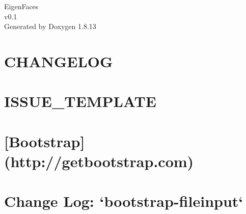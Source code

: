 \documentclass[twoside]{book}
\newcommand{\+}{\discretionary{\mbox{\scriptsize$\hookleftarrow$}}{}{}}
\newcommand{\clearemptydoublepage}{%
  \newpage{\pagestyle{empty}\cleardoublepage}%
}
\begin{document}
\hypersetup{pageanchor=false,
             bookmarksnumbered=true,
             pdfencoding=unicode
            }
\begin{titlepage}
\vspace*{7cm}
\begin{center}%
{\Large Eigen\+Faces \\[1ex]\large v0.\+1 }\\
\vspace*{1cm}
{\large Generated by Doxygen 1.8.13}\\
\end{center}
\end{titlepage}
\clearemptydoublepage
{}
\tableofcontents
\clearemptydoublepage
{}
\hypersetup{pageanchor=true}

\chapter{C\+H\+A\+N\+G\+E\+L\+OG}
\label{md__f_1__git_hub__projects__asdecalidad-1_website_src_website_bower_components_bootstrap__c_h_a_n_g_e_l_o_g}

\chapter{I\+S\+S\+U\+E\+\_\+\+T\+E\+M\+P\+L\+A\+TE}
\label{md__f_1__git_hub__projects__asdecalidad-1_website_src_website_bower_components_bootstrap__i_s_s_u_e__t_e_m_p_l_a_t_e}

\chapter{\mbox{[}Bootstrap\mbox{]}(http\+://getbootstrap.com)}
\label{md__f_1__git_hub__projects__asdecalidad-1_website_src_website_bower_components_bootstrap__r_e_a_d_m_e}

\chapter{Change Log\+: `bootstrap-\/fileinput`}
\label{md__f_1__git_hub__projects__asdecalidad-1_website_src_website_bower_components_bootstrap-fileinput__c_h_a_n_g_e}

\end{document}
